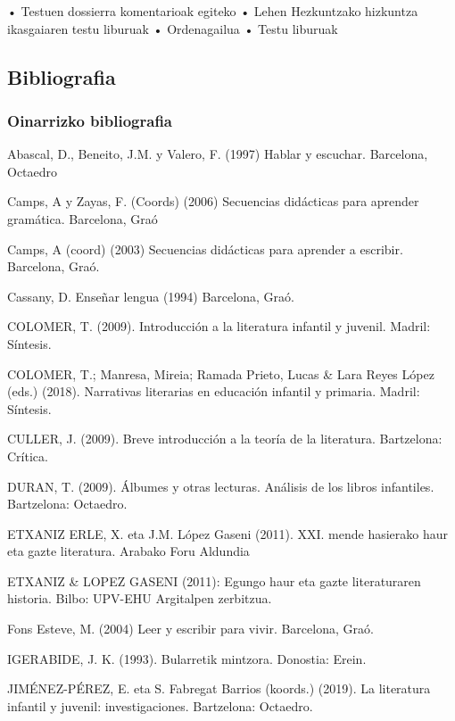 \documentclass[
]{book}
\begin{document}
• Testuen dossierra komentarioak egiteko
• Lehen Hezkuntzako hizkuntza ikasgaiaren testu liburuak
• Ordenagailua
• Testu liburuak

\hypertarget{bibliografia}{%
\subsection*{Bibliografia}\label{bibliografia}}

\hypertarget{oinarrizko-bibliografia}{%
\subsubsection*{Oinarrizko bibliografia}\label{oinarrizko-bibliografia}}

Abascal, D., Beneito, J.M. y Valero, F. (1997) Hablar y escuchar. Barcelona, Octaedro

Camps, A y Zayas, F. (Coords) (2006) Secuencias didácticas para aprender gramática.
Barcelona, Graó

Camps, A (coord) (2003) Secuencias didácticas para aprender a escribir. Barcelona, Graó.

Cassany, D. Enseñar lengua (1994) Barcelona, Graó.

COLOMER, T. (2009). Introducción a la literatura infantil y juvenil. Madril: Síntesis.

COLOMER, T.; Manresa, Mireia; Ramada Prieto, Lucas \& Lara Reyes López (eds.) (2018). Narrativas literarias en educación infantil y primaria. Madril: Síntesis.

CULLER, J. (2009). Breve introducción a la teoría de la literatura. Bartzelona: Crítica.

DURAN, T. (2009). Álbumes y otras lecturas. Análisis de los libros infantiles. Bartzelona: Octaedro.

ETXANIZ ERLE, X. eta J.M. López Gaseni (2011). XXI. mende hasierako haur eta gazte literatura. Arabako Foru Aldundia

ETXANIZ \& LOPEZ GASENI (2011): Egungo haur eta gazte literaturaren historia. Bilbo: UPV-EHU Argitalpen zerbitzua.

Fons Esteve, M. (2004) Leer y escribir para vivir. Barcelona, Graó.

IGERABIDE, J. K. (1993). Bularretik mintzora. Donostia: Erein.

JIMÉNEZ-PÉREZ, E. eta S. Fabregat Barrios (koords.) (2019). La literatura infantil y juvenil: investigaciones. Bartzelona: Octaedro.
\end{document}
